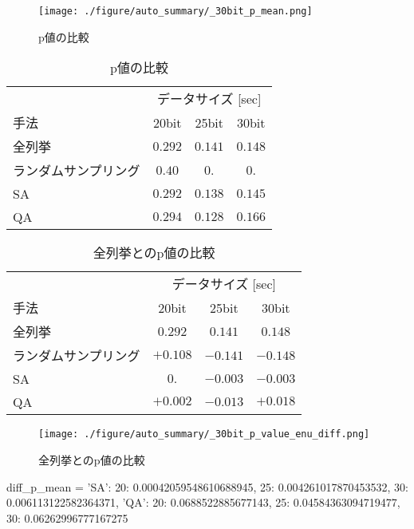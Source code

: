 \begin{figure}
	\begin{center}
		\texttt{[image: ./figure/auto\_summary/\_30bit\_p\_mean.png]}
	\end{center}
	\caption{p値の比較}
	\label{fig:p_value}
\end{figure}

\begin{table}[hbtp]
	\caption{p値の比較}
	\label{tb:p_value}
	\centering
	\begin{tabular}{lccc}
		\hline
		& \multicolumn{3}{c}{データサイズ [sec]}\\手法& 20bit & 25bit & 30bit \\
		\hline\hline
		全列挙 & $0.292$ & $0.141$ & $0.148$ \\
		ランダムサンプリング & $0.40$ & $0.$ & $0.$ \\
		SA & $0.292$ & $0.138$ & $0.145$ \\
		QA & $0.294$ & $0.128$ & $0.166$ \\
		\hline
	\end{tabular}
\end{table}

\begin{table}[hbtp]
	\caption{全列挙とのp値の比較}
	\label{tb:enu_p_value}
	\centering
	\begin{tabular}{lccc}
		\hline
		& \multicolumn{3}{c}{データサイズ [sec]}\\
		手法& 20bit & 25bit & 30bit \\
		全列挙 & $0.292$ & $0.141$ & $0.148$ \\
		\hline\hline
		ランダムサンプリング & $+0.108$ & $-0.141$ & $-0.148$ \\
		SA & $0.$ & $-0.003$ & $-0.003$ \\
		QA & $+0.002$ & $-0.013$ & $+0.018$ \\
		\hline
	\end{tabular}
\end{table}

\begin{figure}
	\begin{center}
		\texttt{[image: ./figure/auto\_summary/\_30bit\_p\_value\_enu\_diff.png]}
	\end{center}
	\caption{全列挙とのp値の比較}
	\label{fig:enu_p_value}
\end{figure}



diff_p_mean = 
{'SA': {20: 0.00042059548610688945,
		25: 0.004261017870453532,
		30: 0.006113122582364371},
	'QA': {20: 0.0688522885677143,
		25: 0.04584363094719477,
		30: 0.06262996777167275}}


